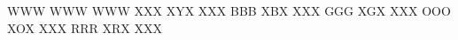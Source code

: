\RubikFaceUp WWW WWW WWW
\RubikFaceDown XXX XYX XXX
\RubikFaceLeft BBB XBX XXX
\RubikFaceRight GGG XGX XXX
\RubikFaceFront OOO XOX XXX
\RubikFaceBack RRR XRX XXX